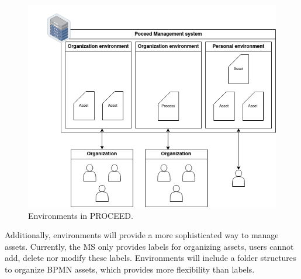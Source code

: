 \begin{figure}[H]
    \centering
    \includegraphics[scale=0.6]{images/proceed-workspaces-v2.drawio.png}
    \caption{Environments in PROCEED.}
    \label{fig:proceed-envitonments-overview}
\end{figure}

Additionally, environments will provide a more sophisticated way to manage assets. 
Currently, the MS only provides labels for organizing assets, users cannot add, delete nor modify these labels.
Environments will include a folder structures to organize BPMN assets, which provides more flexibility than labels.


%
%

